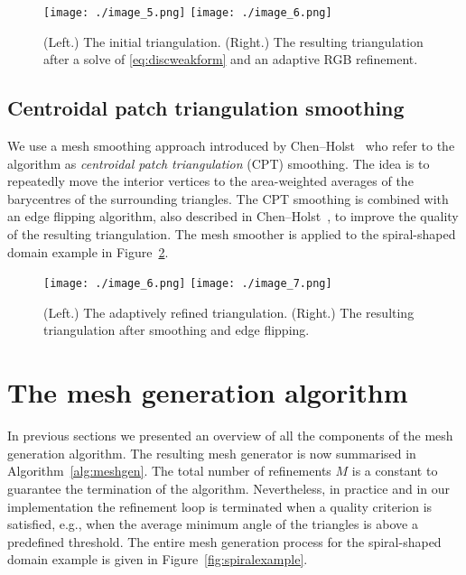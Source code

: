 \documentclass[11pt]{article}
\begin{document}
\begin{figure}[htbp]
\centering
\texttt{[image: ./image\_5.png]}
\texttt{[image: ./image\_6.png]}
\caption{(Left.) The initial triangulation. (Right.) The resulting triangulation
  after a solve of \eqref{eq:discweakform} and an adaptive RGB refinement.}
\label{fig:firstrgb}
\end{figure}

\subsection{Centroidal patch triangulation smoothing}
\label{sec:cpt}

We use a mesh smoothing approach introduced by Chen--Holst~\cite{Chen_2011} who
refer to the algorithm as \emph{centroidal patch triangulation} (CPT) smoothing.
The idea is to repeatedly move the interior vertices to the area-weighted
averages of the barycentres of the surrounding triangles.  The CPT smoothing is
combined with an edge flipping algorithm, also described in
Chen--Holst~\cite{Chen_2011}, to improve the quality of the resulting
triangulation.  The mesh smoother is applied to the spiral-shaped domain example 
in Figure~\ref{fig:firstsmooth}.

\begin{figure}[htbp]
\centering
\texttt{[image: ./image\_6.png]}
\texttt{[image: ./image\_7.png]}
\caption{(Left.) The adaptively refined triangulation. (Right.) The resulting
  triangulation after smoothing and edge flipping.}
\label{fig:firstsmooth}
\end{figure}

\section{The mesh generation algorithm}
\label{sec:orgff9b6c1}

In previous sections we presented an overview of all the components of the mesh
generation algorithm.  The resulting mesh generator is now summarised in
Algorithm~\ref{alg:meshgen}.  The total number of refinements $M$ is a constant
to guarantee the termination of the algorithm.  Nevertheless, in
practice and in our implementation the refinement loop is terminated when a
quality criterion is satisfied, e.g., when the average minimum angle of the
triangles is above a predefined threshold.  The entire mesh generation process
for the spiral-shaped domain example is given in Figure~\ref{fig:spiralexample}.
\end{document}
